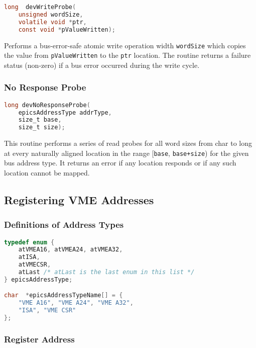 \begin{lstlisting}[language=C]
long  devWriteProbe(
    unsigned wordSize,
    volatile void *ptr,
    const void *pValueWritten);
\end{lstlisting}

Performs a bus-error-safe atomic write operation width \verb|wordSize| which copies the value from \verb|pValueWritten| to the \verb|ptr| location.
The routine returns a failure status (non-zero) if a bus error occurred during the write cycle.

\subsubsection{No Response Probe}

\begin{lstlisting}[language=C]
long devNoResponseProbe(
    epicsAddressType addrType,
    size_t base,
    size_t size);
\end{lstlisting}

This routine performs a series of read probes for all word sizes from char to long at every naturally aligned location in the 
range [\verb|base|, \verb|base+size|) for the given bus address type. It returns an error if any location responds or if any such 
location cannot be mapped.

\subsection{Registering VME Addresses}

\subsubsection{Definitions of Address Types}

\begin{lstlisting}[language=C]
typedef enum {
    atVMEA16, atVMEA24, atVMEA32,
    atISA,
    atVMECSR,
    atLast /* atLast is the last enum in this list */
} epicsAddressType;

char  *epicsAddressTypeName[] = {
    "VME A16", "VME A24", "VME A32",
    "ISA", "VME CSR"
};
\end{lstlisting}

\subsubsection{Register Address}


